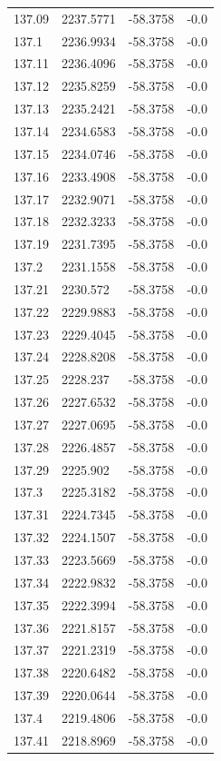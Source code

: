 \begin{table}[H]
\begin{tabular}{llll}
137.09 & 2237.5771 & -58.3758 & -0.0 \\
137.1 & 2236.9934 & -58.3758 & -0.0 \\
137.11 & 2236.4096 & -58.3758 & -0.0 \\
137.12 & 2235.8259 & -58.3758 & -0.0 \\
137.13 & 2235.2421 & -58.3758 & -0.0 \\
137.14 & 2234.6583 & -58.3758 & -0.0 \\
137.15 & 2234.0746 & -58.3758 & -0.0 \\
137.16 & 2233.4908 & -58.3758 & -0.0 \\
137.17 & 2232.9071 & -58.3758 & -0.0 \\
137.18 & 2232.3233 & -58.3758 & -0.0 \\
137.19 & 2231.7395 & -58.3758 & -0.0 \\
137.2 & 2231.1558 & -58.3758 & -0.0 \\
137.21 & 2230.572 & -58.3758 & -0.0 \\
137.22 & 2229.9883 & -58.3758 & -0.0 \\
137.23 & 2229.4045 & -58.3758 & -0.0 \\
137.24 & 2228.8208 & -58.3758 & -0.0 \\
137.25 & 2228.237 & -58.3758 & -0.0 \\
137.26 & 2227.6532 & -58.3758 & -0.0 \\
137.27 & 2227.0695 & -58.3758 & -0.0 \\
137.28 & 2226.4857 & -58.3758 & -0.0 \\
137.29 & 2225.902 & -58.3758 & -0.0 \\
137.3 & 2225.3182 & -58.3758 & -0.0 \\
137.31 & 2224.7345 & -58.3758 & -0.0 \\
137.32 & 2224.1507 & -58.3758 & -0.0 \\
137.33 & 2223.5669 & -58.3758 & -0.0 \\
137.34 & 2222.9832 & -58.3758 & -0.0 \\
137.35 & 2222.3994 & -58.3758 & -0.0 \\
137.36 & 2221.8157 & -58.3758 & -0.0 \\
137.37 & 2221.2319 & -58.3758 & -0.0 \\
137.38 & 2220.6482 & -58.3758 & -0.0 \\
137.39 & 2220.0644 & -58.3758 & -0.0 \\
137.4 & 2219.4806 & -58.3758 & -0.0 \\
137.41 & 2218.8969 & -58.3758 & -0.0 \\

\end{tabular}
\end{table}
